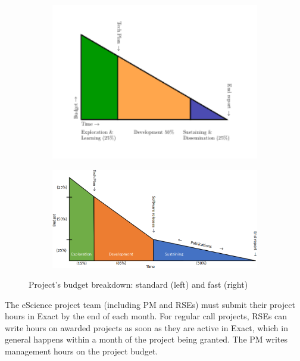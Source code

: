 \begin{figure}[t!]
    \centering
    \begin{subfigure}[b]{0.49\textwidth}
        \centering
        \includegraphics[width=1\textwidth]{img/budget-triangle.pdf}
        \vspace{-1cm}
    \end{subfigure}%
    \begin{subfigure}[b]{0.49\textwidth}
        \centering
        \includegraphics[width=1\textwidth]{img/budget-faster.png}
        \vspace{0.2cm}
    \end{subfigure}
    \caption{Project's budget breakdown: standard (left) and fast (right)}
    \label{fig:project-budget}
\end{figure}

The eScience project team (including PM and RSEs) must submit their project hours in Exact by the end of each month. For
regular call projects, RSEs can write hours on awarded projects as soon as they are active in Exact, which in general
happens within a month of the project being granted. The PM writes management hours on the project budget.

